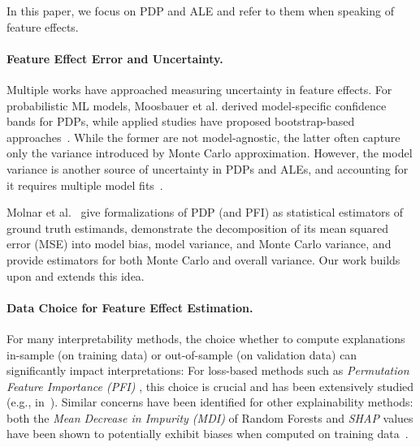 \documentclass[runningheads]{llncs}
\begin{document}
In this paper, we focus on PDP and ALE and refer to them when speaking of
feature effects.

\paragraph{Feature Effect Error and Uncertainty.}
Multiple works have approached measuring uncertainty in feature effects. For
probabilistic ML models, Moosbauer et al.\cite{moosbauer_explaining_2021}
derived model-specific confidence bands for PDPs, while applied studies have
proposed bootstrap-based
approaches~\cite{esselman_landscape_2015,grange_using_2019}. While the former
are not model-agnostic, the latter often capture only the variance introduced
by Monte Carlo approximation. However, the model variance is another source
of uncertainty in PDPs and ALEs, and accounting for it requires multiple model
fits~\cite{apley_visualizing_2020,molnar_general_2022}.

Molnar et al.~\cite{molnar_relating_2023} give formalizations of PDP (and PFI)
as statistical estimators of ground truth estimands, demonstrate the
decomposition of its mean squared error (MSE) into model bias, model variance,
and Monte Carlo variance, and provide estimators for both Monte Carlo and
overall variance. Our work builds upon and extends this idea.

\paragraph{Data Choice for Feature Effect Estimation.}
For many interpretability methods, the choice whether to compute explanations
in-sample (on training data) or out-of-sample (on validation data) can
significantly impact interpretations: For loss-based methods such as
\textit{Permutation Feature Importance (PFI)
}\cite{breiman_random_2001,fisher_all_2019}, this choice is crucial and has
been extensively studied (e.g., in~\cite{molnar_general_2022}). Similar
concerns have been identified for other explainability methods: both the
\textit{Mean Decrease in Impurity (MDI)} of Random Forests and \textit{SHAP}
values have been shown to potentially exhibit biases when computed on training
data~\cite{loecher_debiasing_2022,loecher_debiasing_2024}.
\end{document}

